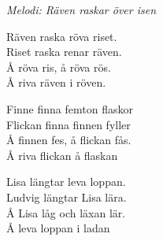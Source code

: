 {\footnotesize\textit{Melodi: Räven raskar över isen}}\par
\vspace{10pt}
Räven raska röva riset.\\
Riset raska renar räven.\\
Å röva ris, å röva rös.\\
Å riva räven i röven.\par
\vspace{10pt}
Finne finna femton flaskor\\
Flickan finna finnen fyller\\
Å finnen fes, å flickan fås.\\
Å riva flickan å flaskan\par
\vspace{10pt}
Lisa längtar leva loppan.\\
Ludvig längtar Lisa lära.\\
Å Lisa låg och läxan lär.\\
Å leva loppan i ladan
